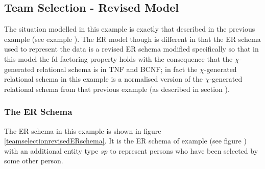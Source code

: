 \subsection{Team Selection - Revised Model}

The situation modelled in this example is exactly that described in the previous example (see example ). The ER model though is different in that the ER schema used to represent the data  is a revised ER schema modified specifically so that in this model the fd factoring property holds with the consequence that the $\chi$-generated relational schema is in TNF and BCNF;  in fact the $\chi$-generated relational schema in this example is a normalised version of the $\chi$-generated relational schema from that 
previous example (as described in section ).

\subsubsection{The ER Schema}
The ER schema in this example is shown in figure \ref{teamselectionrevisedERschema}. It is the ER schema of example  (see figure 
) with an additional entity type $sp$ to represent persons who have been selected by some other person.


